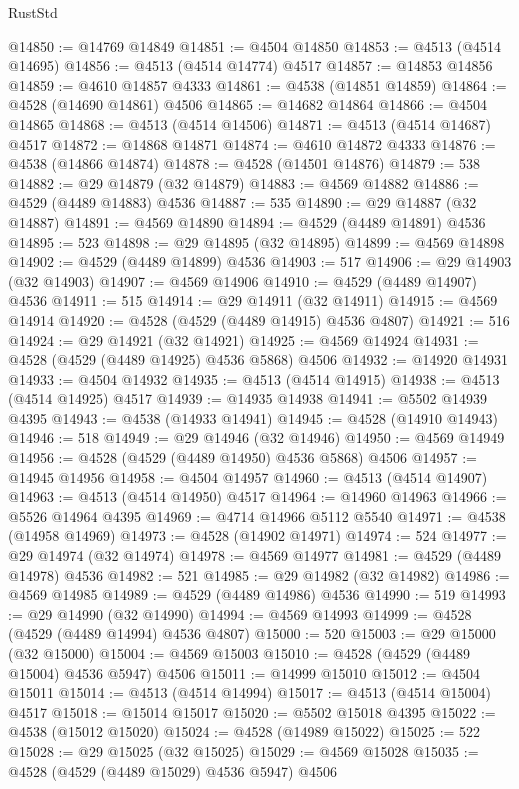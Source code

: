 \begin{lexlean}{RustStd}
\begin{coremodule}
@14850 := @14769 @14849
@14851 := @4504 @14850
@14853 := @4513 (@4514 @14695)
@14856 := @4513 (@4514 @14774) @4517
@14857 := @14853 @14856
@14859 := @4610 @14857 @4333
@14861 := @4538 (@14851 @14859)
@14864 := @4528 (@14690 @14861) @4506
@14865 := @14682 @14864
@14866 := @4504 @14865
@14868 := @4513 (@4514 @14506)
@14871 := @4513 (@4514 @14687) @4517
@14872 := @14868 @14871
@14874 := @4610 @14872 @4333
@14876 := @4538 (@14866 @14874)
@14878 := @4528 (@14501 @14876)
@14879 := 538
@14882 := @29 @14879 (@32 @14879)
@14883 := @4569 @14882
@14886 := @4529 (@4489 @14883) @4536
@14887 := 535
@14890 := @29 @14887 (@32 @14887)
@14891 := @4569 @14890
@14894 := @4529 (@4489 @14891) @4536
@14895 := 523
@14898 := @29 @14895 (@32 @14895)
@14899 := @4569 @14898
@14902 := @4529 (@4489 @14899) @4536
@14903 := 517
@14906 := @29 @14903 (@32 @14903)
@14907 := @4569 @14906
@14910 := @4529 (@4489 @14907) @4536
@14911 := 515
@14914 := @29 @14911 (@32 @14911)
@14915 := @4569 @14914
@14920 := @4528 (@4529 (@4489 @14915) @4536 @4807)
@14921 := 516
@14924 := @29 @14921 (@32 @14921)
@14925 := @4569 @14924
@14931 := @4528 (@4529 (@4489 @14925) @4536 @5868) @4506
@14932 := @14920 @14931
@14933 := @4504 @14932
@14935 := @4513 (@4514 @14915)
@14938 := @4513 (@4514 @14925) @4517
@14939 := @14935 @14938
@14941 := @5502 @14939 @4395
@14943 := @4538 (@14933 @14941)
@14945 := @4528 (@14910 @14943)
@14946 := 518
@14949 := @29 @14946 (@32 @14946)
@14950 := @4569 @14949
@14956 := @4528 (@4529 (@4489 @14950) @4536 @5868) @4506
@14957 := @14945 @14956
@14958 := @4504 @14957
@14960 := @4513 (@4514 @14907)
@14963 := @4513 (@4514 @14950) @4517
@14964 := @14960 @14963
@14966 := @5526 @14964 @4395
@14969 := @4714 @14966 @5112 @5540
@14971 := @4538 (@14958 @14969)
@14973 := @4528 (@14902 @14971)
@14974 := 524
@14977 := @29 @14974 (@32 @14974)
@14978 := @4569 @14977
@14981 := @4529 (@4489 @14978) @4536
@14982 := 521
@14985 := @29 @14982 (@32 @14982)
@14986 := @4569 @14985
@14989 := @4529 (@4489 @14986) @4536
@14990 := 519
@14993 := @29 @14990 (@32 @14990)
@14994 := @4569 @14993
@14999 := @4528 (@4529 (@4489 @14994) @4536 @4807)
@15000 := 520
@15003 := @29 @15000 (@32 @15000)
@15004 := @4569 @15003
@15010 := @4528 (@4529 (@4489 @15004) @4536 @5947) @4506
@15011 := @14999 @15010
@15012 := @4504 @15011
@15014 := @4513 (@4514 @14994)
@15017 := @4513 (@4514 @15004) @4517
@15018 := @15014 @15017
@15020 := @5502 @15018 @4395
@15022 := @4538 (@15012 @15020)
@15024 := @4528 (@14989 @15022)
@15025 := 522
@15028 := @29 @15025 (@32 @15025)
@15029 := @4569 @15028
@15035 := @4528 (@4529 (@4489 @15029) @4536 @5947) @4506

\end{coremodule}
\end{lexlean}
